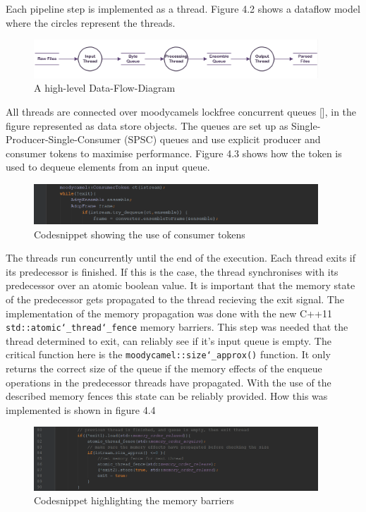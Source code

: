 Each pipeline step is implemented as a thread. Figure 4.2 shows a dataflow model where the circles represent the threads. 

\begin{figure}[h]
\centering
      \includegraphics[width=0.95\textwidth]{dfd}
        \caption{A high-level Data-Flow-Diagram }
\end{figure}

 All threads are connected over moodycamels lockfree concurrent queues [], in the figure represented as data store objects. The queues are set up as Single-Producer-Single-Consumer (SPSC) queues and use explicit producer and consumer tokens to maximise performance. Figure 4.3 shows how the token is used to dequeue elements from an input queue.

\begin{figure}[h]	
\centering
      \includegraphics[width=0.95\textwidth]{ct}
        \caption{Codesnippet showing the use of consumer tokens}
\end{figure}

The threads run concurrently until the end of the execution. Each thread exits if its predecessor is finished. If this is the case, the thread synchronises with its predecessor over an atomic boolean value. It is important that the memory state of the predecessor gets propagated to the thread recieving the exit signal. The implementation of the memory propagation was done with the new C++11 \texttt{std::atomic\char`_thread\char`_fence} memory barriers. This step was needed that the thread determined to exit, can reliably see if it's input queue is empty. The critical function here is the \texttt{moodycamel::size\char`_approx()} function. It only returns the correct size of the queue if the memory effects of the enqueue operations in the predecessor threads have propagated. With the use of the described memory fences this state can be reliably provided. How this was implemented is shown in figure 4.4

\begin{figure}[h]
\centering
      \includegraphics[width=0.95\textwidth]{memory_barrier}
        \caption{Codesnippet highlighting the memory barriers}
\end{figure}

